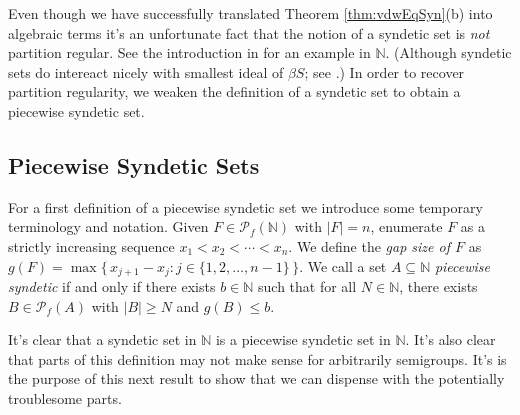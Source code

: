 \documentclass[12pt,showtrims]{memoir}
\theoremstyle{plain}
\theoremstyle{definition}
\newcommand{\bbN}{\mathbb{N}}
\newcommand{\Pf}{\mathcal{P}_f}
\begin{document}
Even though we have successfully translated Theorem \ref{thm:vdwEqSyn}(b) into algebraic terms it's an unfortunate fact that the notion of a syndetic set is \emph{not} partition regular. 
See the introduction in \cite{Bergelson:2001ve} for an example in $\bbN$.
(Although syndetic sets do intereact nicely with smallest ideal of $\beta S$; see \cite[Theorems 4.39 and 4.43]{Hindman:1998fk}.)
In order to recover partition regularity, we weaken the definition of a syndetic set to obtain a piecewise syndetic set.

\subsection{Piecewise Syndetic Sets}
For a first definition of a piecewise syndetic set we introduce some temporary terminology and notation.
Given $F \in \Pf(\bbN)$ with $|F| = n$, enumerate $F$ as a strictly increasing sequence $x_1 < x_2 < \cdots < x_n$. 
We define the \emph{gap size of $F$} as $g(F) = \max\bigr\{\, x_{j+1} - x_j : j \in \{1, 2, \ldots, n-1\} \,\bigl\}$.
We call a set $A \subseteq \bbN$ \emph{piecewise syndetic} if and only if there exists $b \in \bbN$ such that for all $N \in \bbN$, there exists $B \in \Pf(A)$ with $|B| \ge N$ and $g(B) \le b$.

It's clear that a syndetic set in $\bbN$ is a piecewise syndetic set in $\bbN$.
It's also clear that  parts of this definition may not make sense for arbitrarily semigroups.
It's is the purpose of this next result to show that we can dispense with the potentially troublesome parts.
\end{document}
